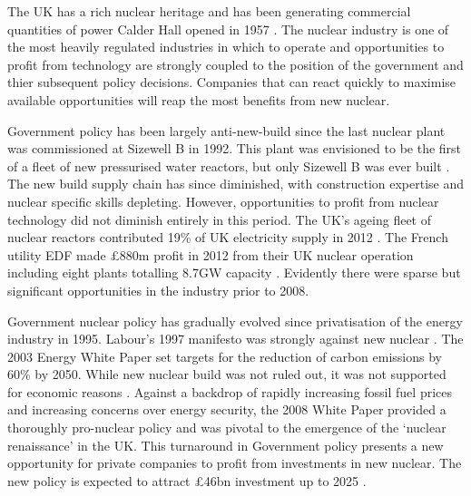 {}

The UK has a rich nuclear heritage and has been generating commercial quantities of power Calder Hall opened in 1957 \cite{calder}. 
The nuclear industry is one of the most heavily regulated industries in which to operate and opportunities to profit from technology are strongly coupled to the position of the government and thier subsequent policy decisions. 
Companies that can react quickly to maximise available opportunities will reap the most benefits from new nuclear.

 

Government policy has been largely anti-new-build since the last nuclear plant was commissioned at Sizewell B in 1992. This plant was envisioned to be the first of a fleet of new pressurised water reactors, but only Sizewell B was ever built \cite{worldnuclear}. 
The new build supply chain has since diminished, with construction expertise and nuclear specific skills depleting.
However, opportunities to profit from nuclear technology did not diminish entirely in this period. 
The UK's ageing fleet of nuclear reactors contributed 19\% of UK electricity supply in 2012 \cite{Worldnuclear}.  
The French utility EDF made \pounds880m profit in 2012 from their UK nuclear operation including eight plants totalling 8.7GW capacity \cite{EDFResults}. 
Evidently there were sparse but significant opportunities in the industry prior to 2008.

Government nuclear policy has gradually evolved since privatisation of the energy industry in 1995. 
Labour’s 1997 manifesto was strongly against new nuclear \cite{Birmingham}. 
The 2003 Energy White Paper set targets for the reduction of carbon emissions by 60\% by 2050. 
While new nuclear build was not ruled out, it was not supported for economic reasons \cite{WP2006}. 
Against a backdrop of rapidly increasing fossil fuel prices and increasing concerns over energy security, the 2008 White Paper provided a thoroughly pro-nuclear policy \cite{WP2008} and was pivotal to the emergence of the `nuclear renaissance’ in the UK.
This turnaround in Government policy presents a new opportunity for private companies to profit from investments in new nuclear. 
The new policy is expected to attract \pounds46bn investment up to 2025 \cite{needtofindthefigure}.


